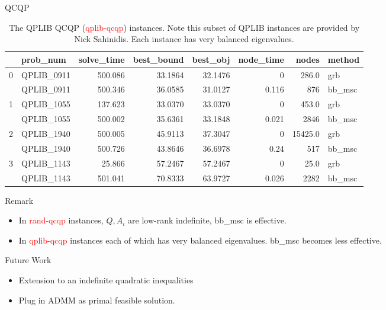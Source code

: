 \documentclass[aspectratio=1610, 9pt]{beamer}
\newcommand{\redsf}[1]{\textcolor{red}{\textsf{#1}}}
\begin{document}
\begin{frame}[standout]{QCQP}
  \begin{table}[h!]
    \begin{tabular}{llrrrrrl}
      \toprule
      {} & prob\_num   & solve\_time & best\_bound & best\_obj & node\_time & nodes   & method  \\
      \midrule
      0  & QPLIB\_0911 & 500.086     & 33.1864     & 32.1476   & 0          & 286.0   & grb     \\
         & QPLIB\_0911 & 500.346     & 36.0585     & 31.0127   & 0.116      & 876     & bb\_msc \\
      1  & QPLIB\_1055 & 137.623     & 33.0370     & 33.0370   & 0          & 453.0   & grb     \\
         & QPLIB\_1055 & 500.002     & 35.6361     & 33.1848   & 0.021      & 2846    & bb\_msc \\
      2  & QPLIB\_1940 & 500.005     & 45.9113     & 37.3047   & 0          & 15425.0 & grb     \\
         & QPLIB\_1940 & 500.726     & 43.8646     & 36.6978   & 0.24       & 517     & bb\_msc \\
      3  & QPLIB\_1143 & 25.866      & 57.2467     & 57.2467   & 0          & 25.0    & grb     \\
         & QPLIB\_1143 & 501.041     & 70.8333     & 63.9727   & 0.026      & 2282    & bb\_msc \\
      \bottomrule
    \end{tabular}
    \caption{The QPLIB QCQP (\redsf{qplib-qcqp}) instances. Note this subset of QPLIB instances are provided by Nick Sahinidis. Each instance has very balanced eigenvalues.}
  \end{table}

  \normalsize
  Remark
  \begin{itemize}
    \item In \redsf{rand-qcqp} instances, \(Q, A_i\) are low-rank indefinite, bb\_msc is effective.
    \item In \redsf{qplib-qcqp} instances each of which has very balanced eigenvalues. bb\_msc becomes less effective.
  \end{itemize}
\end{frame}
\setlength\pdfpagewidth{16.00cm}%
\setlength\pdfpageheight{10.00cm}%
\begin{frame}[allowframebreaks]{Future Work}
  \begin{itemize}
    \item Extension to an indefinite quadratic inequalities
    \item Plug in ADMM as primal feasible solution.
  \end{itemize}
\end{frame}
\end{document}
